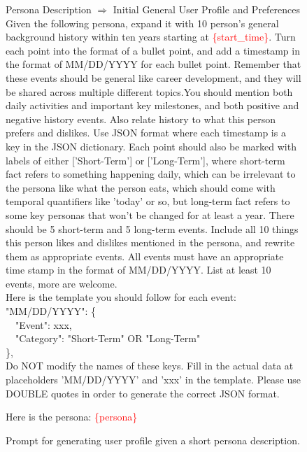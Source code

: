 \begin{figure}[h]
\begin{prompt}{Persona Description $\Rightarrow$ Initial General User Profile and Preferences}
Given the following persona, expand it with 10 person's general background history within ten years starting at \textcolor{red}{\{start\_time\}}. Turn each point into the format of a bullet point, and add a timestamp in the format of MM/DD/YYYY for each bullet point. Remember that these events should be general like career development, and they will be shared across multiple different topics.You should mention both daily activities and important key milestones, and both positive and negative history events. Also relate history to what this person prefers and dislikes. Use JSON format where each timestamp is a key in the JSON dictionary. Each point should also be marked with labels of either ['Short-Term'] or ['Long-Term'], where short-term fact refers to something happening daily, which can be irrelevant to the persona like what the person eats, which should come with temporal quantifiers like 'today' or so, but long-term fact refers to some key personas that won't be changed for at least a year. There should be 5 short-term and 5 long-term events. Include all 10 things this person likes and dislikes mentioned in the persona, and rewrite them as appropriate events. All events must have an appropriate time stamp in the format of MM/DD/YYYY. List at least 10 events, more are welcome. \\ 

Here is the template you should follow for each event: \\

"MM/DD/YYYY": \{ \\
    \, \, "Event": xxx, \\
    \, \, "Category": "Short-Term" OR "Long-Term" \\
\},\\

Do NOT modify the names of these keys. Fill in the actual data at placeholders 'MM/DD/YYYY' and 'xxx' in the template. Please use DOUBLE quotes in order to generate the correct JSON format.

Here is the persona: \textcolor{red}{\{persona\}}

\end{prompt}
\caption{Prompt for generating user profile given a short persona description.}\label{fig:prompt1}
\end{figure}



